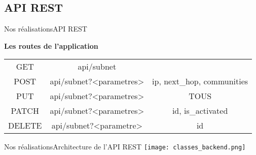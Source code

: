 \subsection{API REST}

\begin{frame}{Nos réalisations}{API REST}

\textbf{Les routes de l'application}

\begin{table}
    \begin{tabulary}{\textwidth}{|C C C|}
        \hline
        \color{background}{Méthode HTTP} & \color{background}{URI} & \color{background}{Paramètres}\\
        \hline
	    GET & api/subnet & \\
	    POST & api/subnet?<parametres> & ip, next\_hop, communities \\
	    PUT & api/subnet?<parametres> & TOUS \\
	    PATCH & api/subnet?<parametres> & id, is\_activated \\
	    DELETE & api/subnet?<parametre> & id \\
	    \hline
	\end{tabulary}
\end{table}
\end{frame}

\begin{frame}{Nos réalisations}{Architecture de l'API REST}
    \texttt{[image: classes\_backend.png]}
\end{frame}